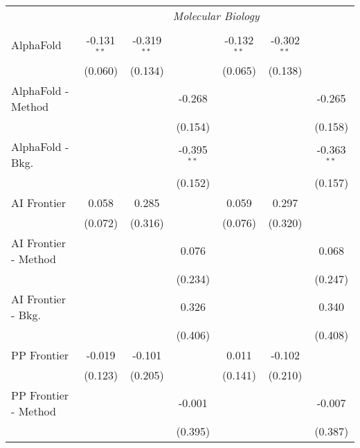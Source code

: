 \begin{tabular}{lcccccc}
 & \multicolumn{6}{c}{\textit{Molecular Biology}} \\ \\
   AlphaFold            & -0.131$^{**}$ & -0.319$^{**}$ &               & -0.132$^{**}$ & -0.302$^{**}$ &   \\   
                        & (0.060)       & (0.134)       &               & (0.065)       & (0.138)       &   \\   
   AlphaFold - Method   &               &               & -0.268        &               &               & -0.265\\   
                        &               &               & (0.154)       &               &               & (0.158)\\   
   AlphaFold - Bkg.     &               &               & -0.395$^{**}$ &               &               & -0.363$^{**}$\\   
                        &               &               & (0.152)       &               &               & (0.157)\\   
   AI Frontier          & 0.058         & 0.285         &               & 0.059         & 0.297         &   \\   
                        & (0.072)       & (0.316)       &               & (0.076)       & (0.320)       &   \\   
   AI Frontier - Method &               &               & 0.076         &               &               & 0.068\\   
                        &               &               & (0.234)       &               &               & (0.247)\\   
   AI Frontier - Bkg.   &               &               & 0.326         &               &               & 0.340\\   
                        &               &               & (0.406)       &               &               & (0.408)\\   
   PP Frontier          & -0.019        & -0.101        &               & 0.011         & -0.102        &   \\   
                        & (0.123)       & (0.205)       &               & (0.141)       & (0.210)       &   \\   
   PP Frontier - Method &               &               & -0.001        &               &               & -0.007\\   
                        &               &               & (0.395)       &               &               & (0.387)\\   

\end{tabular}
